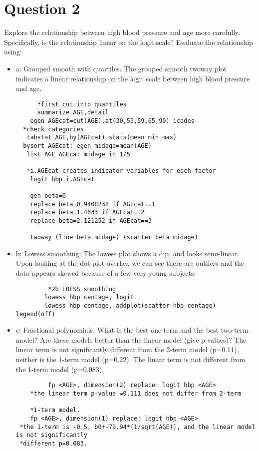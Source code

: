 \documentclass{article}
\begin{document}
\section{Question 2} 
  Explore the relationship between high blood pressure and age more carefully.  Specifically, is the relationship linear on the logit scale?  Evaluate the relationship using:
\begin{itemize}
    \item a:  Grouped smooth with quartiles.  The grouped smooth twoway plot indicates a linear relationship on the logit scale between high blood pressure and age. 
    \begin{verbatim}
      *first cut into quantiles
	  summarize AGE,detail
	egen AGEcat=cut(AGE),at(30,53,59,65,90) icodes
  *check categories
   tabstat AGE,by(AGEcat) stats(mean min max)
  bysort AGEcat: egen midage=mean(AGE)
   list AGE AGEcat midage in 1/5
   
   *i.AGEcat creates indicator variables for each factor
    logit hbp i.AGEcat
	
	gen beta=0
	replace beta=0.9408238 if AGEcat==1
	replace beta=1.4633 if AGEcat==2
	replace beta=2.121252 if AGEcat==3
	
	twoway (line beta midage) (scatter beta midage)
    \end{verbatim}
    \item b: Lowess smoothing: The lowess plot shows a dip, and looks semi-linear.  Upon looking at the dot plot overlay, we can see there are outliers and the data appears skewed because of a few very young subjects.
     \begin{verbatim}
         *2b LOESS smoothing
		lowess hbp centage, logit
    	lowess hbp centage, addplot(scatter hbp centage) legend(off)
	     \end{verbatim}
    
    
    \item c: Fractional polynomials.   What is the best one-term and the best two-term model?   Are these models better than the linear model (give p-values)? 
    The linear term is not significantly different from the 2-term model (p=0.11), neither is the 1-term model (p=0.22).  The linear term is not different from the 1-term model (p=0.083).
     \begin{verbatim}
         fp <AGE>, dimension(2) replace: logit hbp <AGE>
	*the linear term p-value =0.111 does not differ from 2-term
	
	*1-term model.
	fp <AGE>, dimension(1) replace: logit hbp <AGE>
 *the 1-term is -0.5, b0+-79.94*(1/sqrt(AGE)), and the linear model is not significantly
 *different p=0.083.
	

\end{verbatim}
\end{itemize}
\end{document}
